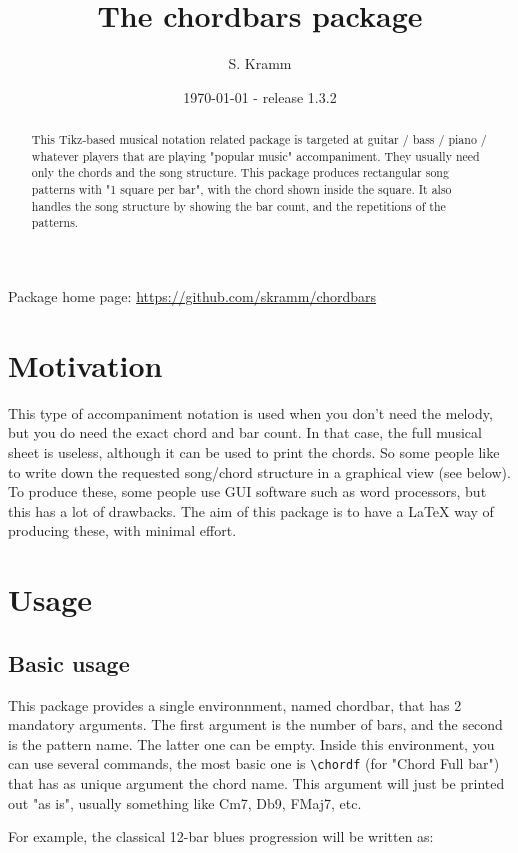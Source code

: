 \documentclass[11pt]{article}
\title{The chordbars package}
\author{S. Kramm}
\date{\today {} - release 1.3.2}
\begin{document}
\maketitle

\begin{abstract}
This Tikz-based musical notation related package is targeted at guitar / bass / piano / whatever players that are playing "popular music" accompaniment.
They usually need only the chords and the song structure.
This package produces rectangular song patterns with "1 square per bar", with the chord shown inside the square.
It also handles the song structure by showing the bar count, and the repetitions of the patterns.
\end{abstract}

Package home page: \url{https://github.com/skramm/chordbars}

\section{Motivation}

This type of accompaniment notation is used when you don't need the melody, but you do need the exact chord and bar count.
In that case, the full musical sheet is useless, although it can be used to print the chords.
So some people like to write down the requested song/chord structure in a graphical view (see below).
To produce these, some people use GUI software such as word processors, but this has a lot of drawbacks.
The aim of this package is to have a \LaTeX{} way of producing these, with minimal effort.


\section{Usage}
\subsection{Basic usage}
This package provides a single environnment, named {\ttfamily chordbar}, that has 2 mandatory arguments.
The first argument is the number of bars, and the second is the pattern name.
The latter one can be empty.
Inside this environment, you can use several commands, the most basic one is 
\verb|\chordf| (for "Chord Full bar") that has as unique argument the chord name.
This argument will just be printed out "as is", usually something like Cm7, Db9, FMaj7, etc.

For example, the classical 12-bar blues progression will be written as:
\end{document}
